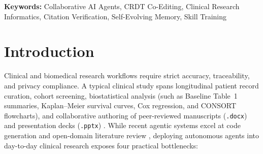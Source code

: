 \documentclass[11pt,a4paper]{article}
\begin{document}
\vspace{4pt}
\noindent\textbf{Keywords:} Collaborative AI Agents, CRDT Co-Editing, Clinical Research Informatics, Citation Verification, Self-Evolving Memory, Skill Training

\section{Introduction}
\label{sec:intro}

Clinical and biomedical research workflows require strict accuracy, traceability, and privacy compliance. A typical clinical study spans longitudinal patient record curation, cohort screening, biostatistical analysis (such as Baseline Table~1 summaries, Kaplan--Meier survival curves, Cox regression, and CONSORT flowcharts), and collaborative authoring of peer-reviewed manuscripts (\texttt{.docx}) and presentation decks (\texttt{.pptx}) \cite{schulz2010consort,vandenbroucke2007strobe}. While recent agentic systems excel at code generation \cite{yang2024sweagent,wang2024openhands} and open-domain literature review \cite{shao2024storm,skarlinski2024paperqa2}, deploying autonomous agents into day-to-day clinical research exposes four practical bottlenecks:
\end{document}
